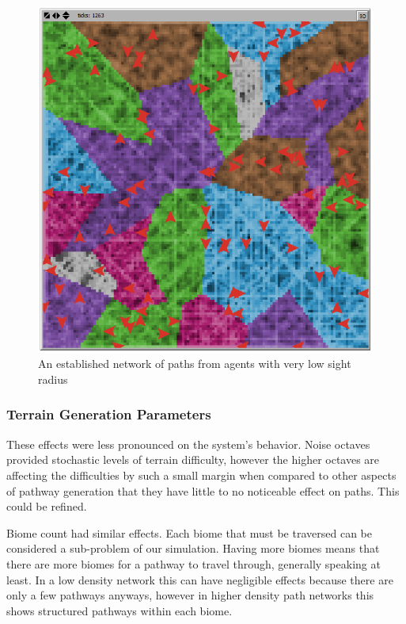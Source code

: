 \documentclass[conference]{IEEEtran}
\begin{document}
\begin{figure}[h]
\begin{center}
\includegraphics[scale=0.4]{image/results6}
\end{center}
\caption{An established network of paths from agents with very low sight radius}
\end{figure}

\subsubsection{Terrain Generation Parameters}
These effects were less pronounced on the system's behavior. Noise octaves provided stochastic levels of terrain difficulty, however the higher octaves are affecting the difficulties by such a small margin when compared to other aspects of pathway generation that they have little to no noticeable effect on paths. This could be refined.

Biome count had similar effects. Each biome that must be traversed can be considered a sub-problem of our simulation. Having more biomes means that there are more biomes for a pathway to travel through, generally speaking at least. In a low density network this can have negligible effects because there are only a few pathways anyways, however in higher density path networks this shows structured pathways within each biome. 
\end{document}
